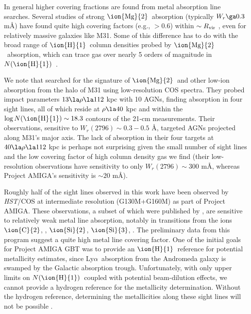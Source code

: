 \documentclass[12pt,preprint]{aastex6}
\newcommand{\HI}{\ensuremath{\mbox{\ion{H}{1}}}}
\newcommand{\SiII}{\ensuremath{\mbox{\ion{Si}{2}}}}
\newcommand{\SiIII}{\ensuremath{\mbox{\ion{Si}{3}}}}
\newcommand{\CII}{\ensuremath{\mbox{\ion{C}{2}}}}
\newcommand{\MgII}{\ensuremath{\mbox{\ion{Mg}{2}}}}
\newcommand{\lya}{Ly$\alpha$\relax}
\newcommand{\NHI}{\ensuremath{N(\mbox{\ion{H}{1}})}\relax}
\newcommand{\logNHI}{\ensuremath{\log N(\mbox{\ion{H}{1}})}\relax}
\newcommand{\Rvir}{\ensuremath{R_{\rm vir}}\relax}
\newcommand{\hst}{{\em HST}}
\begin{document}
In general higher covering fractions are found from metal absorption
line searches. Several studies of strong \MgII\ absorption (typically
$W_r \ga 0.3$ m\AA ) have found quite high covering factors (e.g.,
$>0.6$) within $\sim\Rvir$ \citep{chen2010, nielsen2013}, even for
relatively massive galaxies like M31. Some of this difference has to
do with the broad range of \HI\ column densities probed by \MgII\
absorption, which can trace gas over nearly 5 orders of magnitude in
\NHI\ \citep[gas with $\log N(\mbox{\MgII}) \sim 13$ --
$W_r(2796) \sim 0.3$ m\AA\ -- can probe solar metallicity gas with
$\logNHI \sim 16$ or damped Ly$\alpha$ systems with $<1/300$ of the
solar metallicity; ][]{wotta2016}.

We note that \cite{rao2013} searched for the signature of \MgII\ and
other low-ion absorption from the halo of M31 using low-resolution COS
spectra. They probed impact parameters $13 \la \rho \la 112$ kpc with
10 AGNs, finding absorption in four sight lines, all of which reside
at $\rho \la 40$ kpc and within the $\logNHI \sim 18.3$ contours of
the 21-cm measurements. Their observations, sensitive to
$W_r(2796) \sim 0.3 - 0.5$ \AA, targeted AGNs projected along
M31's major axis. The lack of absorption in their four targets
at $40 \la \rho \la 112$ kpc is perhaps not surprising given the small
number of sight lines and the low covering factor of high column
density gas we find (their low-resolution observations have
sensitivity to only $W_r(2796) \sim 300$ m\AA, whereas Project AMIGA's
sensitivity is $\sim20$ m\AA).

Roughly half of the sight lines observed in this work have been
observed by \hst /COS at intermediate resolution (G130M+G160M) as part
of Project AMIGA. These observations, a subset of which were published
by \citetalias{lehner2015}, are sensitive to relatively weak metal
line absorption, notably in transitions from the ions \CII,
, \SiII, \SiIII, . The preliminary data from this
program suggest a quite high metal line covering factor. One of the
initial goals for Project AMIGA GBT was to provide an \HI\ reference
for potential metallicity estimates, since \lya\ absorption from the
Andromeda galaxy is swamped by the Galactic absorption
trough. Unfortunately, with only upper limits on \NHI\ coupled with
potential beam-dilution effects, we cannot provide a hydrogen
reference for the metallicity determination. Without the hydrogen
reference, determining the metallicities along these sight lines will
not be possible \citep[on this point we disagree with the recent work
of ][]{koch2015}.
\end{document}
